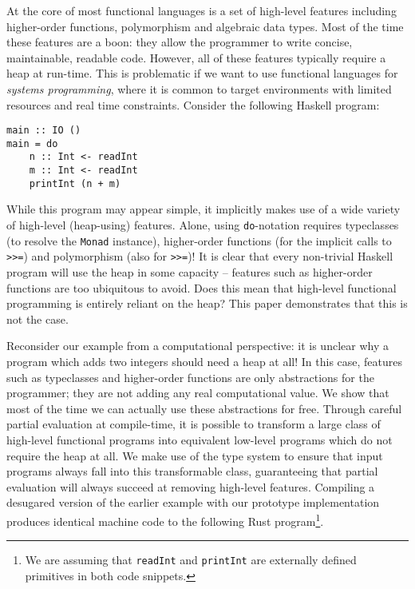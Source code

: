 \documentclass[runningheads]{llncs}
\begin{document}
At the core of most functional languages is a set of high-level features including higher-order functions, polymorphism and algebraic data types. Most of the time these features are a boon: they allow the programmer to write concise, maintainable, readable code. However, all of these features typically require a heap at run-time. This is problematic if we want to use functional languages for \emph{systems programming}, where it is common to target environments with limited resources and real time constraints. Consider the following Haskell program:

\begin{verbatim}
main :: IO ()
main = do
    n :: Int <- readInt
    m :: Int <- readInt
    printInt (n + m)
\end{verbatim}

While this program may appear simple, it implicitly makes use of a wide variety of high-level (heap-using) features. Alone, using \texttt{do}-notation requires typeclasses (to resolve the \texttt{Monad} instance), higher-order functions (for the implicit calls to \texttt{>>=}) and polymorphism (also for \texttt{>>=})! It is clear that every non-trivial Haskell program will use the heap in some capacity -- features such as higher-order functions are too ubiquitous to avoid. Does this mean that high-level functional programming is entirely reliant on the heap? This paper demonstrates that this is not the case.

Reconsider our example from a computational perspective: it is unclear why a program which adds two integers should need a heap at all! In this case, features such as typeclasses and higher-order functions are only abstractions for the programmer; they are not adding any real computational value. We show that most of the time we can actually use these abstractions for free. Through careful partial evaluation at compile-time, it is possible to transform a large class of high-level functional programs into equivalent low-level programs which do not require the heap at all. We make use of the type system to ensure that input programs always fall into this transformable class, guaranteeing that partial evaluation will always succeed at removing high-level features. Compiling a desugared version of the earlier example with our prototype implementation produces identical machine code to the following Rust program\footnote{We are assuming that \texttt{readInt} and \texttt{printInt} are externally defined primitives in both code snippets.}.
\end{document}
